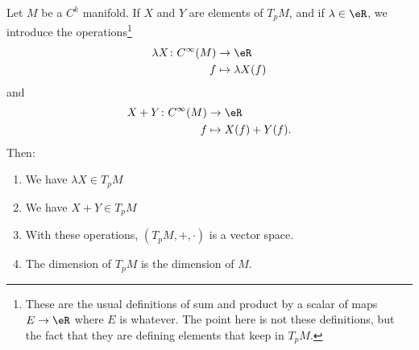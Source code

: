 \begin{definition}		\label{PROPooEJBWooSbvypo}
	Let \( M\) be a \( C^k\) manifold. If \( X\) and \( Y \) are elements of \( T_pM\), and if \( \lambda\in \eR\), we introduce the operations\footnote{These are the usual definitions of sum and product by a scalar of maps \( E\to \eR\) where \( E\) is whatever. The point here is not these definitions, but the fact that they are defining elements that keep in \( T_pM\).}
	\begin{equation}
		\begin{aligned}
			\lambda X\colon  C^{\infty}(M) & \to \eR              \\
			f                              & \mapsto \lambda X(f)
		\end{aligned}
	\end{equation}
	and
	\begin{equation}
		\begin{aligned}
			X+Y\colon  C^{\infty}(M) & \to \eR            \\
			f                        & \mapsto X(f)+Y(f).
		\end{aligned}
	\end{equation}
	Then:
	\begin{enumerate}
		\item
		      We have \( \lambda X\in T_pM\)
		\item
		      We have \( X+Y\in T_pM\)
		\item		\label{ITEMooDRUQooWrsaDd}
		      With these operations, \( (T_pM,+,\cdot)\) is a vector space.
		\item		\label{ITEMooJEYEooLuJiqz}
		      The dimension of \( T_pM\) is the dimension of \( M\).
	\end{enumerate}
\end{definition}


